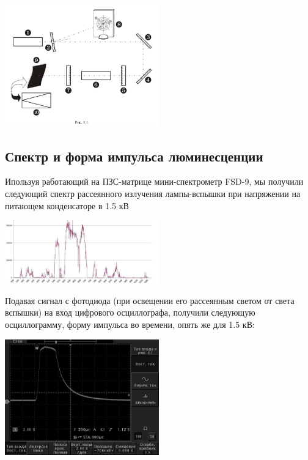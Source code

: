 \documentclass[twocolumn]{article}
\begin{document}
    \begin{center}
    \includegraphics[width=0.5\textwidth]{LEMPH Report_files/LEMPH Report_14_0.png}
    \par
    \end{center}
               
        
    
\subsection{Спектр и форма импульса люминесценции}Ипользуя работающий на ПЗС-матрице мини-спектрометр FSD-9, мы получили
следующий спектр рассеянного излучения лампы-вспышки при напряжении на
питающем конденсаторе в 1.5 кВ


    
        
    \begin{center}
    \includegraphics[width=0.5\textwidth]{LEMPH Report_files/LEMPH Report_17_0.jpeg}
    \par
    \end{center}
           
            
Подавая сигнал с фотодиода (при освещении его рассеянным светом от света
вспышки) на вход цифрового осциллографа, получили следующую
осциллограмму, форму импульса во времени, опять же для 1.5 кВ:

   
    \begin{center}
    \includegraphics[width=0.5\textwidth]{LEMPH Report_files/LEMPH Report_19_0.jpeg}
    \par
    \end{center}
    
\end{document}
